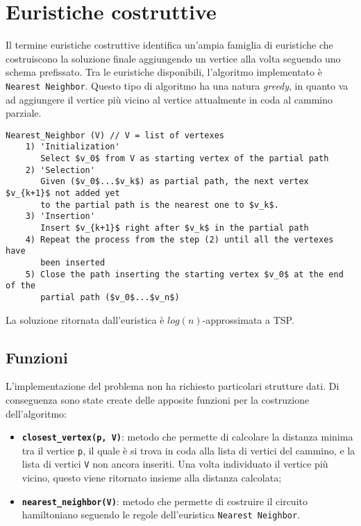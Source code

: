 \section{Euristiche costruttive}\label{constructive_heuristic}

Il termine euristiche costruttive identifica un'ampia famiglia di euristiche che costruiscono la soluzione finale aggiungendo un vertice alla volta seguendo uno schema prefissato. Tra le euristiche disponibili, l'algoritmo implementato è \texttt{Nearest Neighbor}. Questo tipo di algoritmo ha una natura \textit{greedy}, in quanto va ad aggiungere il vertice più vicino al vertice attualmente in coda al cammino parziale.

\begin{lstlisting}[mathescape=true]
Nearest_Neighbor (V) // V = list of vertexes
	1) 'Initialization'
	   Select $v_0$ from V as starting vertex of the partial path
	2) 'Selection'
	   Given ($v_0$...$v_k$) as partial path, the next vertex $v_{k+1}$ not added yet 
	   to the partial path is the nearest one to $v_k$. 
	3) 'Insertion'
	   Insert $v_{k+1}$ right after $v_k$ in the partial path
	4) Repeat the process from the step (2) until all the vertexes have
	   been inserted
	5) Close the path inserting the starting vertex $v_0$ at the end of the
	   partial path ($v_0$...$v_n$)
\end{lstlisting}

La soluzione ritornata dall'euristica è $log(n)$-approssimata a TSP.

\subsection{Funzioni}
L'implementazione del problema non ha richiesto particolari strutture dati. Di conseguenza sono state create delle apposite funzioni per la costruzione dell'algoritmo:
\begin{itemize}
	\item \texttt{\textbf{closest\_vertex(p, V)}}: metodo che permette di calcolare la distanza minima tra il vertice \texttt{p}, il quale è si trova in coda alla lista di vertici del cammino, e la lista di vertici \texttt{V} non ancora inseriti. Una volta individuato il vertice più vicino, questo viene ritornato insieme alla distanza calcolata;
	\item \texttt{\textbf{nearest\_neighbor(V)}}: metodo che permette di costruire il circuito hamiltoniano seguendo le regole dell'euristica \texttt{Nearest Neighbor}. 
\end{itemize}

